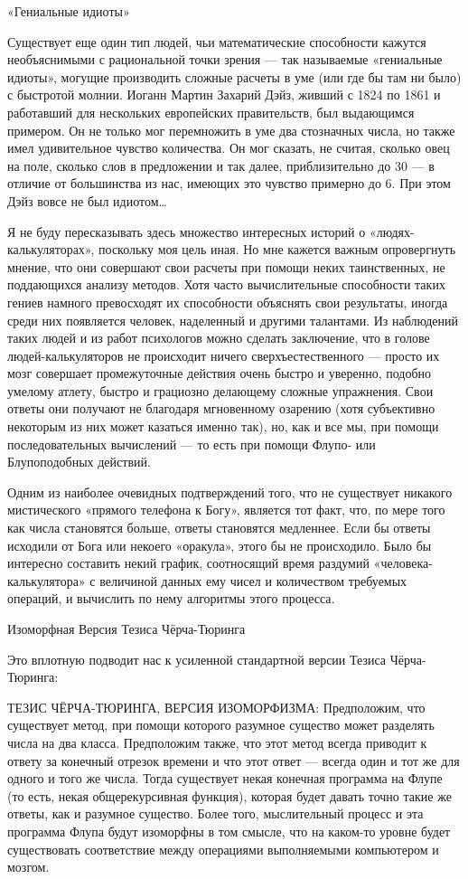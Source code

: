 \documentclass[../main.tex]{subfiles}
\begin{document}
«Гениальные идиоты»

Существует еще один тип людей, чьи математические способности кажутся необъяснимыми с рациональной точки зрения --- так называемые «гениальные идиоты», могущие производить сложные расчеты в уме (или где бы там ни было) с быстротой молнии. Иоганн Мартин Захарий Дэйз, живший с 1824 по 1861 и работавший для нескольких европейских правительств, был выдающимся примером. Он не только мог перемножить в уме два стозначных числа, но также имел удивительное чувство количества. Он мог сказать, не считая, сколько овец на поле, сколько слов в предложении и так далее, приблизительно до 30 --- в отличие от большинства из нас, имеющих это чувство примерно до 6. При этом Дэйз вовсе не был идиотом\ldots{}

Я не буду пересказывать здесь множество интересных историй о «людях-калькуляторах», поскольку моя цель иная. Но мне кажется важным опровергнуть мнение, что они совершают свои расчеты при помощи неких таинственных, не поддающихся анализу методов. Хотя часто вычислительные способности таких гениев намного превосходят их способности объяснять свои результаты, иногда среди них появляется человек, наделенный и другими талантами. Из наблюдений таких людей и из работ психологов можно сделать заключение, что в голове людей-калькуляторов не происходит ничего сверхъестественного --- просто их мозг совершает промежуточные действия очень быстро и уверенно, подобно умелому атлету, быстро и грациозно делающему сложные упражнения. Свои ответы они получают не благодаря мгновенному озарению (хотя субъективно некоторым из них может казаться именно так), но, как и все мы, при помощи последовательных вычислений --- то есть при помощи Флупо- или Блупоподобных действий.

Одним из наиболее очевидных подтверждений того, что не существует никакого мистического «прямого телефона к Богу», является тот факт, что, по мере того как числа становятся больше, ответы становятся медленнее. Если бы ответы исходили от Бога или некоего «оракула», этого бы не происходило. Было бы интересно составить некий график, соотносящий время раздумий «человека-калькулятора» с величиной данных ему чисел и количеством требуемых операций, и вычислить по нему алгоритмы этого процесса.

Изоморфная Версия Тезиса Чёрча-Тюринга

Это вплотную подводит нас к усиленной стандартной версии Тезиса Чёрча-Тюринга:

ТЕЗИС ЧЁРЧА-ТЮРИНГА, ВЕРСИЯ ИЗОМОРФИЗМА: Предположим, что существует метод, при помощи которого разумное существо может разделять числа на два класса. Предположим также, что этот метод всегда приводит к ответу за конечный отрезок времени и что этот ответ --- всегда один и тот же для одного и того же числа. Тогда существует некая конечная программа на Флупе (то есть, некая общерекурсивная функция), которая будет давать точно такие же ответы, как и разумное существо. Более того, мыслительный процесс и эта программа Флупа будут изоморфны в том смысле, что на каком-то уровне будет существовать соответствие между операциями выполняемыми компьютером и мозгом.
\end{document}
